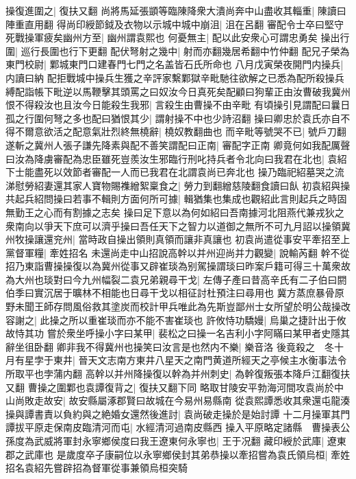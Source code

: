 操復進圍之|{
	復扶又翻}
尚將馬延張顗等臨陳降衆大潰尚奔中山盡收其輜重|{
	陳讀曰陣重直用翻}
得尚印綬節鉞及衣物以示城中城中崩沮|{
	沮在呂翻}
審配令士卒曰堅守死戰操軍疲矣幽州方至|{
	幽州謂袁熙也}
何憂無主|{
	配以此安衆心可謂忠勇矣}
操出行圍|{
	巡行長圍也行下更翻}
配伏弩射之幾中|{
	射而亦翻幾居希翻中竹仲翻}
配兄子榮為東門校尉|{
	鄴城東門口建春門七門之名盖皆石氏所命也}
八月戊寅榮夜開門内操兵|{
	内讀曰納}
配拒戰城中操兵生獲之辛評家繫鄴獄辛毗馳往欲解之已悉為配所殺操兵縛配詣帳下毗逆以馬鞭擊其頭罵之曰奴汝今日真死矣配顧曰狗輩正由汝曹破我冀州恨不得殺汝也且汝今日能殺生我邪|{
	言殺生由曹操不由辛毗}
有頃操引見謂配曰曩日孤之行圍何弩之多也配曰猶恨其少|{
	謂射操不中也少詩沼翻}
操曰卿忠於袁氏亦自不得不爾意欲活之配意氣壯烈終無橈辭|{
	橈奴教翻曲也}
而辛毗等號哭不已|{
	號戶刀翻}
遂斬之冀州人張子謙先降素與配不善笑謂配曰正南|{
	審配字正南}
卿竟何如我配厲聲曰汝為降虜審配為忠臣雖死豈羨汝生邪臨行刑叱持兵者令北向曰我君在北也|{
	袁紹下士能盡死以效節者審配一人而已我君在北謂袁尚已奔北也}
操乃臨祀紹墓哭之流涕慰勞紹妻還其家人寶物賜襍繒絮稟食之|{
	勞力到翻繒慈陵翻食讀曰飤}
初袁紹與操共起兵紹問操曰若事不輯則方面何所可據|{
	輯猶集也集成也觀紹此言則起兵之時固無勤王之心而有割據之志矣}
操曰足下意以為何如紹曰吾南據河北阻燕代兼戎狄之衆南向以爭天下庶可以濟乎操曰吾任天下之智力以道御之無所不可九月詔以操領冀州牧操讓還兖州|{
	當時政自操出領則真領而讓非真讓也}
初袁尚遣從事安平牽招至上黨督軍糧|{
	牽姓招名}
未還尚走中山招說高幹以并州迎尚并力觀變|{
	說輸芮翻}
幹不從招乃東詣曹操操復以為冀州從事又辟崔琰為别駕操謂琰曰昨案戶籍可得三十萬衆故為大州也琰對曰今九州幅裂二袁兄弟親尋干戈|{
	左傳子產曰昔高辛氏有二子伯曰閼伯季曰實沉居于曠林不相能也日尋干戈以相征討杜預注曰尋用也}
冀方蒸庶暴骨原野未聞王師存問風俗救其塗炭而校計甲兵唯此為先斯豈鄙州士女所望於明公哉操改容謝之|{
	此操之所以重崔琰而亦不能不害崔琰也}
許攸恃功驕嫚|{
	烏巢之捷計出于攸故恃其功}
嘗於衆坐呼操小字曰某甲|{
	裴松之曰操一名吉利小字阿瞞曰某甲者史隱其辭坐徂卧翻}
卿非我不得冀州也操笑曰汝言是也然内不樂|{
	樂音洛}
後竟殺之　冬十月有星孛于東井|{
	晉天文志南方東井八星天之南門黄道所經天之亭候主水衡事法令所取平也孛蒲内翻}
高幹以并州降操復以幹為并州刺史|{
	為幹復叛張本降戶江翻復扶又翻}
曹操之圍鄴也袁譚復背之|{
	復扶又翻下同}
略取甘陵安平勃海河間攻袁尚於中山尚敗走故安|{
	故安縣屬涿郡賢曰故城在今易州易縣南}
從袁熙譚悉收其衆還屯龍湊操與譚書責以負約與之絶婚女還然後進討|{
	袁尚破走操於是始討譚}
十二月操軍其門譚拔平原走保南皮臨清河而屯|{
	水經清河過南皮縣西}
操入平原略定諸縣　曹操表公孫度為武威將軍封永寧鄉侯度曰我王遼東何永寧也|{
	王于况翻}
藏印綬於武庫|{
	遼東郡之武庫也}
是歲度卒子康嗣位以永寧鄉侯封其弟恭操以牽招嘗為袁氏領烏桓|{
	牽姓招名袁紹先嘗辟招為督軍從事兼領烏桓突騎}
